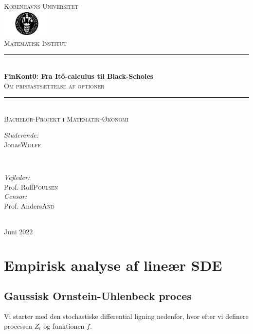 \documentclass{article}
\title{\thesistitle}
\author{\thesisauthorfirst\space\thesisauthorsecond}
\date{\thesisdate}
\def\thesistitle{FinKont0: Fra Itô-calculus til Black-Scholes}
\def\thesissubtitle{Om prisfastsættelse af optioner}
\def\thesisauthorfirst{Jonas}
\def\thesisauthorsecond{Wolff}
\def\thesissupervisorfirst{Prof. Rolf}
\def\thesissupervisorsecond{Poulsen}
\def\thesissecondreaderfirst{Prof. Anders}
\def\thesissecondreadersecond{And}
\def\thesisdate{Juni 2022}
\theoremstyle{definition}
\theoremstyle{remark}
\begin{document}
\begin{titlepage}
	\thispagestyle{empty}
	\newcommand{\HRule}{\rule{\linewidth}{0.5mm}}
	\center
	\textsc{\Large Københavns Universitet}\\[.7cm]
	\includegraphics[width=25mm]{img/ku_segl.png}\\[.5cm]
	\textsc{Matematisk Institut}\\[0.5cm]
	
	\HRule \\[0.4cm]
	{ \huge \bfseries \thesistitle}\\[0.1cm]
	\textsc{\thesissubtitle}\\
	\HRule \\[.5cm]
	\textsc{\large Bachelor-Projekt i Matematik-Økonomi}\\[.5cm]
	
	\begin{minipage}{0.4\textwidth}
	\begin{flushleft} \large
	\emph{Studerende:}\\
	\thesisauthorfirst\space \textsc{\thesisauthorsecond}
	\end{flushleft}
	\end{minipage}
	~
	\begin{minipage}{0.4\textwidth}
	\begin{flushright} \large
	\emph{Vejleder:} \\
	\thesissupervisorfirst\space \textsc{\thesissupervisorsecond} \\[1em]
	\emph{Censor:} \\
	\thesissecondreaderfirst\space \textsc{\thesissecondreadersecond}
	\end{flushright}
	\end{minipage}\\[4cm]
	\vfill
	{\large \thesisdate}\\
	\clearpage
\end{titlepage}

\tableofcontents

\newpage
\section{Empirisk analyse af lineær SDE}
\subsection{Gaussisk Ornstein-Uhlenbeck proces}
Vi starter med den stochastiske differential ligning nedenfor, hvor efter vi definere processen $Z_t$ og funktionen $f$.
\end{document}
